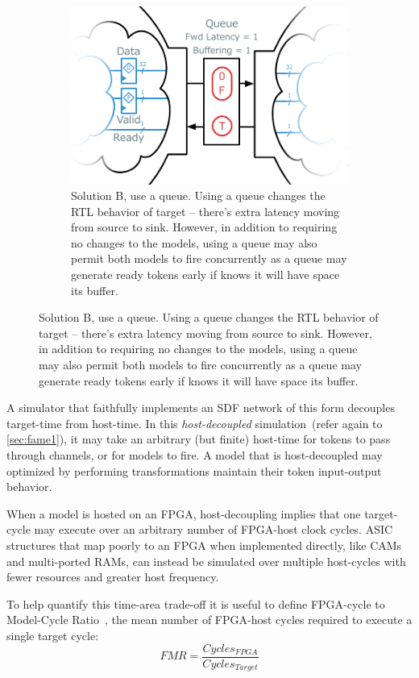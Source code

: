 \begin{figure}
\begin{subfigure}[t]{0.48\textwidth}
    \end{subfigure}\hspace{0.5cm}
    \begin{subfigure}[t]{0.48\textwidth}
        \includegraphics[width=\textwidth]{figures/queue-decoupled-example.pdf}
        \caption{Solution B, use a queue. Using a queue changes the RTL
        behavior of target -- there's extra latency moving from source to sink.
        However, in addition to requiring no changes to the models, using a queue may also
        permit both models to fire concurrently as a queue may generate
        ready tokens early if knows it will have space its buffer.}
        \label{fig:queue-decoupled-example}
    \end{subfigure}
\end{figure}

A simulator that faithfully implements an SDF network of this form decouples
target-time from host-time. In this \emph{host-decoupled} simulation~(refer again to \ref{sec:fame1}), it may
take an arbitrary (but finite) host-time for tokens to pass through channels,
or for models to fire. A model that is host-decoupled may optimized by
performing transformations maintain their token input-output behavior.

When a model is hosted on an FPGA, host-decoupling implies that one target-cycle may
execute over an arbitrary number of FPGA-host clock cycles.  ASIC structures
that map poorly to an FPGA when implemented directly, like CAMs and
multi-ported RAMs, can instead be simulated over multiple host-cycles with
fewer resources and greater host frequency.

To help quantify this time-area trade-off it is useful to define FPGA-cycle to
Model-Cycle Ratio~\cite{APorts}, the mean number of FPGA-host cycles required to
execute a single target cycle: $$ FMR = \frac{Cycles_{FPGA}}{Cycles_{Target}}
$$

